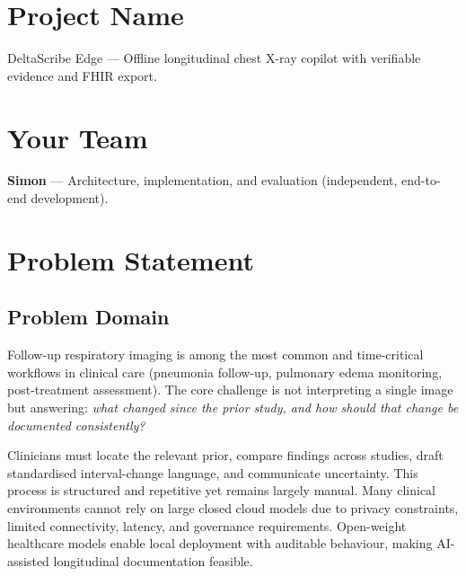 \documentclass[10pt,twocolumn]{article}
\begin{document}
\thispagestyle{empty}

\section{Project Name}

DeltaScribe Edge --- Offline longitudinal chest X-ray copilot with verifiable evidence and FHIR export.

\section{Your Team}

\textbf{Simon} --- Architecture, implementation, and evaluation (independent, end-to-end development).

\section{Problem Statement}

\subsection{Problem Domain}

Follow-up respiratory imaging is among the most common and time-critical workflows in clinical care (pneumonia follow-up, pulmonary edema monitoring, post-treatment assessment).
The core challenge is not interpreting a single image but answering: \emph{what changed since the prior study, and how should that change be documented consistently?}

Clinicians must locate the relevant prior, compare findings across studies, draft standardised interval-change language, and communicate uncertainty.
This process is structured and repetitive yet remains largely manual.
Many clinical environments cannot rely on large closed cloud models due to privacy constraints, limited connectivity, latency, and governance requirements.
Open-weight healthcare models enable local deployment with auditable behaviour, making AI-assisted longitudinal documentation feasible.
\end{document}
